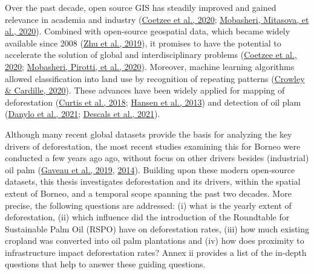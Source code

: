 \documentclass[
  letterpaper,
  DIV=11,
  numbers=noendperiod]{scrreprt}
\begin{document}
Over the past decade, open source GIS has steadily improved and gained
relevance in academia and industry
(\protect\hyperlink{ref-coetzeeOpenGeospatialSoftware2020}{Coetzee et
al., 2020};
\protect\hyperlink{ref-mobasheriHighlightingRecentTrends2020}{Mobasheri,
Mitasova, et al., 2020}). Combined with open-source geospatial data,
which became widely available since 2008
(\protect\hyperlink{ref-zhuBenefitsFreeOpen2019}{Zhu et al., 2019}), it
promises to have the potential to accelerate the solution of global and
interdisciplinary problems
(\protect\hyperlink{ref-coetzeeOpenGeospatialSoftware2020}{Coetzee et
al., 2020};
\protect\hyperlink{ref-mobasheriOpensourceGeospatialTools2020}{Mobasheri,
Pirotti, et al., 2020}). Moreover, machine learning algorithms allowed
classification into land use by recognition of repeating patterns
(\protect\hyperlink{ref-crowleyRemoteSensingRecent2020}{Crowley \&
Cardille, 2020}). These advances have been widely applied for mapping of
deforestation
(\protect\hyperlink{ref-curtisClassifyingDriversGlobal2018}{Curtis et
al., 2018};
\protect\hyperlink{ref-hansenHighResolutionGlobalMaps2013}{Hansen et
al., 2013}) and detection of oil plam
(\protect\hyperlink{ref-danyloMapExtentYear2021}{Danylo et al., 2021};
\protect\hyperlink{ref-descalsHighresolutionGlobalMap2021}{Descals et
al., 2021}).

Although many recent global datasets provide the basis for analyzing the
key drivers of deforestation, the most recent studies examining this for
Borneo were conducted a few years ago ago, without focus on other
drivers besides (industrial) oil palm
(\protect\hyperlink{ref-gaveauRiseFallForest2019}{Gaveau et al., 2019},
\protect\hyperlink{ref-gaveauFourDecadesForest2014}{2014}). Building
upon these modern open-source datasets, this thesis investigates
deforestation and its drivers, within the spatial extent of Borneo, and
a temporal scope spanning the past two decades. More precise, the
following questions are addressed: (i) what is the yearly extent of
deforestation, (ii) which influence did the introduction of the
Roundtable for Sustainable Palm Oil (RSPO) have on deforestation rates,
(iii) how much existing cropland was converted into oil palm plantations
and (iv) how does proximity to infrastructure impact deforestation
rates? Annex ii provides a list of the in-depth questions that help to
answer these guiding questions.
\end{document}
